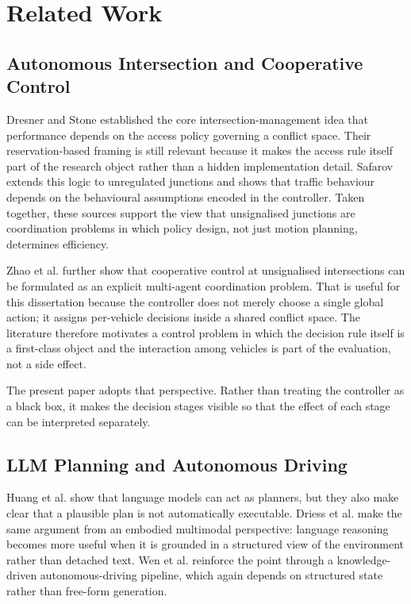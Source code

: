 \documentclass[letterpaper,10pt,conference]{ieeeconf}
\begin{document}
\section{Related Work}
\subsection{Autonomous Intersection and Cooperative Control}
Dresner and Stone \cite{Dresner2008} established the core intersection-management idea that performance depends on the access policy governing a conflict space. Their reservation-based framing is still relevant because it makes the access rule itself part of the research object rather than a hidden implementation detail. Safarov \cite{Safarov2022} extends this logic to unregulated junctions and shows that traffic behaviour depends on the behavioural assumptions encoded in the controller. Taken together, these sources support the view that unsignalised junctions are coordination problems in which policy design, not just motion planning, determines efficiency.

Zhao et al. \cite{Zhao2025} further show that cooperative control at unsignalised intersections can be formulated as an explicit multi-agent coordination problem. That is useful for this dissertation because the controller does not merely choose a single global action; it assigns per-vehicle decisions inside a shared conflict space. The literature therefore motivates a control problem in which the decision rule itself is a first-class object and the interaction among vehicles is part of the evaluation, not a side effect.

The present paper adopts that perspective. Rather than treating the controller as a black box, it makes the decision stages visible so that the effect of each stage can be interpreted separately.

\subsection{LLM Planning and Autonomous Driving}
Huang et al. \cite{Huang2022} show that language models can act as planners, but they also make clear that a plausible plan is not automatically executable. Driess et al. \cite{Driess2023} make the same argument from an embodied multimodal perspective: language reasoning becomes more useful when it is grounded in a structured view of the environment rather than detached text. Wen et al. \cite{Wen2023} reinforce the point through a knowledge-driven autonomous-driving pipeline, which again depends on structured state rather than free-form generation.
\end{document}

